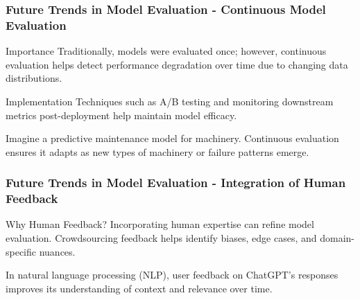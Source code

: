 \documentclass[aspectratio=169]{beamer}
\begin{document}
\begin{frame}[fragile]
    \frametitle{Future Trends in Model Evaluation - Continuous Model Evaluation}
    \begin{block}{Importance}
        Traditionally, models were evaluated once; however, continuous evaluation helps detect performance degradation over time due to changing data distributions.
    \end{block}

    \begin{block}{Implementation}
        Techniques such as A/B testing and monitoring downstream metrics post-deployment help maintain model efficacy.
    \end{block}

    \begin{example}
        Imagine a predictive maintenance model for machinery. Continuous evaluation ensures it adapts as new types of machinery or failure patterns emerge.
    \end{example}
\end{frame}

\begin{frame}[fragile]
    \frametitle{Future Trends in Model Evaluation - Integration of Human Feedback}
    \begin{block}{Why Human Feedback?}
        Incorporating human expertise can refine model evaluation. Crowdsourcing feedback helps identify biases, edge cases, and domain-specific nuances.
    \end{block}

    \begin{example}
        In natural language processing (NLP), user feedback on ChatGPT's responses improves its understanding of context and relevance over time.
    \end{example}
\end{frame}
\end{document}
